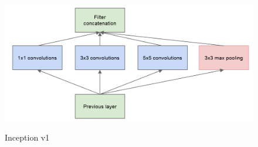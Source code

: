 \begin{figure}[h]
  \centering
  \includegraphics[width=13cm, height=6cm]{Img/Inception.jpg}
  \caption{Inception v1}
  \label{fig:inception-v1}
\end{figure}
